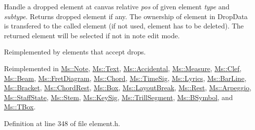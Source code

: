 Handle a dropped element at canvas relative {\itshape pos} of given element {\itshape type} and {\itshape subtype}. Returns dropped element if any. The ownership of element in Drop\+Data is transfered to the called element (if not used, element has to be deleted). The returned element will be selected if not in note edit mode.

Reimplemented by elements that accept drops. 

Reimplemented in \hyperlink{class_ms_1_1_note_a8c52c0c09eef8173b3bc7b42f2a4210a}{Ms\+::\+Note}, \hyperlink{class_ms_1_1_text_a410338a533177c7f52bbd691505211a0}{Ms\+::\+Text}, \hyperlink{class_ms_1_1_accidental_acdbf43ac373defb983202d4f7c8e3555}{Ms\+::\+Accidental}, \hyperlink{class_ms_1_1_measure_ab1083a3a6e0ac7cd35a27d9d71829560}{Ms\+::\+Measure}, \hyperlink{class_ms_1_1_clef_a3a9ca86d904b55728c1cd9c65b15ecef}{Ms\+::\+Clef}, \hyperlink{class_ms_1_1_beam_adea642fbb6e75bb9f004fe86968a8d03}{Ms\+::\+Beam}, \hyperlink{class_ms_1_1_fret_diagram_ae054df6c63b099396073d3f4c6604262}{Ms\+::\+Fret\+Diagram}, \hyperlink{class_ms_1_1_chord_ac91b212e92e0840f3ffd4f4751af8a39}{Ms\+::\+Chord}, \hyperlink{class_ms_1_1_time_sig_a3d1b3e9783dd176c2e479ecf3e250e2a}{Ms\+::\+Time\+Sig}, \hyperlink{class_ms_1_1_lyrics_acbb976663d84ab3abf82d0609574b26f}{Ms\+::\+Lyrics}, \hyperlink{class_ms_1_1_bar_line_af03756bb0cd6b98d703bcdaa1c161876}{Ms\+::\+Bar\+Line}, \hyperlink{class_ms_1_1_bracket_a09f6e7e760bff48faef75b12db95755e}{Ms\+::\+Bracket}, \hyperlink{class_ms_1_1_chord_rest_a1277a12746bf12af5cbf79d95ada6a21}{Ms\+::\+Chord\+Rest}, \hyperlink{class_ms_1_1_box_ac1ec659f101990a90822f10edccdc2e6}{Ms\+::\+Box}, \hyperlink{class_ms_1_1_layout_break_a6baf8d925ef42d68aa8a3c9df9d694d6}{Ms\+::\+Layout\+Break}, \hyperlink{class_ms_1_1_rest_a4dec6c49aaf416289c5e2f78a2074c64}{Ms\+::\+Rest}, \hyperlink{class_ms_1_1_arpeggio_a2e88f8c714c6b69b52503d48729b973b}{Ms\+::\+Arpeggio}, \hyperlink{class_ms_1_1_staff_state_a053476091ca14ed47e7e79e9bd1202cf}{Ms\+::\+Staff\+State}, \hyperlink{class_ms_1_1_stem_adbefb546ff6099b87df6f750c20d8354}{Ms\+::\+Stem}, \hyperlink{class_ms_1_1_key_sig_aa151797b5a5391bdd93b07d754ab370e}{Ms\+::\+Key\+Sig}, \hyperlink{class_ms_1_1_trill_segment_a743f071ab284f933eefa50dac98b7dde}{Ms\+::\+Trill\+Segment}, \hyperlink{class_ms_1_1_b_symbol_a88e83f2a4c92f2c1fcea20b2834f0a69}{Ms\+::\+B\+Symbol}, and \hyperlink{class_ms_1_1_t_box_a3be73eda7f604bdaa08d124d68a84bca}{Ms\+::\+T\+Box}.



Definition at line 348 of file element.\+h.

